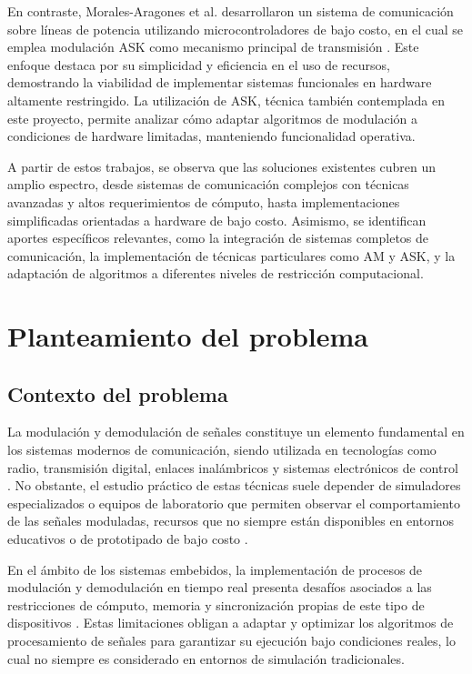 En contraste, Morales-Aragones et al. desarrollaron un sistema de comunicación sobre líneas de potencia utilizando microcontroladores de bajo costo, en el cual se emplea modulación ASK como mecanismo principal de transmisión \cite{pic_ask}. Este enfoque destaca por su simplicidad y eficiencia en el uso de recursos, demostrando la viabilidad de implementar sistemas funcionales en hardware altamente restringido. La utilización de ASK, técnica también contemplada en este proyecto, permite analizar cómo adaptar algoritmos de modulación a condiciones de hardware limitadas, manteniendo funcionalidad operativa.

A partir de estos trabajos, se observa que las soluciones existentes cubren un amplio espectro, desde sistemas de comunicación complejos con técnicas avanzadas y altos requerimientos de cómputo, hasta implementaciones simplificadas orientadas a hardware de bajo costo. Asimismo, se identifican aportes específicos relevantes, como la integración de sistemas completos de comunicación, la implementación de técnicas particulares como AM y ASK, y la adaptación de algoritmos a diferentes niveles de restricción computacional.


\section{Planteamiento del problema}
\label{sec:planteamiento_problema}
\subsection{Contexto del problema}

La modulación y demodulación de señales constituye un elemento fundamental en los sistemas modernos de comunicación, siendo utilizada en tecnologías como radio, transmisión digital, enlaces inalámbricos y sistemas electrónicos de control \cite{haykin2001}. No obstante, el estudio práctico de estas técnicas suele depender de simuladores especializados o equipos de laboratorio que permiten observar el comportamiento de las señales moduladas, recursos que no siempre están disponibles en entornos educativos o de prototipado de bajo costo \cite{oppenheim1997}.

En el ámbito de los sistemas embebidos, la implementación de procesos de modulación y demodulación en tiempo real presenta desafíos asociados a las restricciones de cómputo, memoria y sincronización propias de este tipo de dispositivos \cite{heath2002}. Estas limitaciones obligan a adaptar y optimizar los algoritmos de procesamiento de señales para garantizar su ejecución bajo condiciones reales, lo cual no siempre es considerado en entornos de simulación tradicionales.

